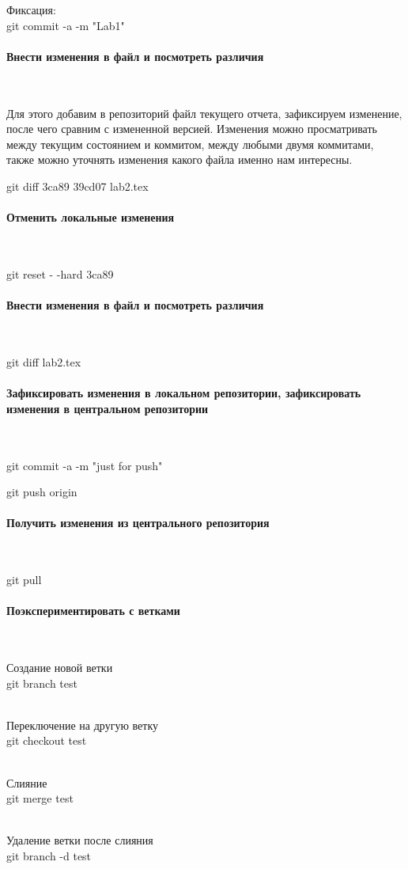 \documentclass{article}
\begin{document}
Фиксация: \\
git commit -a -m "Lab1" \\

\paragraph{Внести изменения в файл и посмотреть различия}
~

Для этого добавим в репозиторий файл текущего отчета, зафиксируем изменение, после чего сравним с измененной версией. Изменения можно просматривать между текущим состоянием и коммитом, между любыми двумя коммитами, также можно уточнять изменения какого файла именно нам интересны.

git diff 3ca89 39cd07 lab2.tex

\paragraph{Отменить локальные изменения}
~

git reset - -hard 3ca89

\paragraph{Внести изменения в файл и посмотреть различия}
~

git diff lab2.tex

\paragraph{Зафиксировать изменения в локальном репозитории, зафиксировать изменения в центральном репозитории}
~

git commit -a -m "just for push"

git push origin

\paragraph{Получить изменения из центрального репозитория}
~

git pull

\paragraph{Поэкспериментировать с ветками}
~

Создание новой ветки \\
git branch test \\
~

Переключение на другую ветку \\
git checkout test \\
~

Слияние \\
git merge test \\
~

Удаление ветки после слияния \\
git branch -d test \\
~
\end{document}
